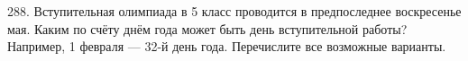 288. Вступительная олимпиада в 5 класс проводится в предпоследнее воскресенье мая. Каким по счёту днём года может быть день вступительной работы? Например, 1 февраля --- 32-й день года. Перечислите все возможные варианты.\\
